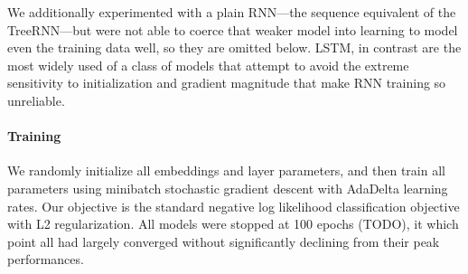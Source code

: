 We additionally experimented with a plain RNN---the sequence equivalent of the TreeRNN---but were not able to coerce that weaker model into learning to model even the training data well, so they are omitted below. LSTM, in contrast are the most widely used of a class of models that attempt to avoid the extreme sensitivity to initialization and gradient magnitude that make RNN training so unreliable.

\paragraph{Training} We randomly initialize all embeddings and layer parameters, and then train all parameters using minibatch stochastic gradient descent with AdaDelta \cite{zeiler2012adadelta} learning rates. Our objective is the standard negative log likelihood classification objective with L2 regularization. All models were stopped at 100 epochs (TODO), it which point all had largely converged without significantly declining from their peak performances.
